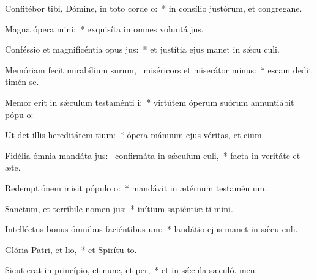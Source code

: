 \item Confitébor tibi, Dómine, in toto corde o:~* in consílio justórum, et congregane.
\item Magna ópera mini:~* exquisíta in omnes voluntá jus.
\item Conféssio et magnificéntia opus jus:~* et justítia ejus manet in sǽcu culi.
\item Memóriam fecit mirabílium surum,~\pscross{} miséricors et miserátor minus:~* escam dedit timén se.
\item Memor erit in sǽculum testaménti i:~* virtútem óperum suórum annuntiábit pópu o:
\item Ut det illis hereditátem tium:~* ópera mánuum ejus véritas, et cium.
\item Fidélia ómnia mandáta jus:~\pscross{} confirmáta in sǽculum culi,~* facta in veritáte et æte.
\item Redemptiónem misit pópulo o:~* mandávit in ætérnum testamén um.
\item Sanctum, et terríbile nomen jus:~* inítium sapiéntiæ ti mini.
\item Intelléctus bonus ómnibus faciéntibus um:~* laudátio ejus manet in sǽcu culi.
\item Glória Patri, et lio,~* et Spirítu to.
\item Sicut erat in princípio, et nunc, et per,~* et in sǽcula sæculó. men.

